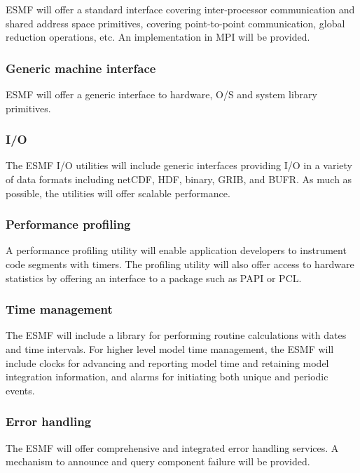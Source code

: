 ESMF will offer a standard interface covering inter-processor
communication and shared address space primitives, covering
point-to-point communication, global reduction operations, etc. An
implementation in MPI will be provided.

\subsubsection{Generic machine interface}

ESMF will offer a generic interface to hardware, O/S and system
library primitives.

\subsubsection{I/O}

The ESMF I/O utilities will include generic interfaces providing I/O
in a variety of data formats including netCDF, HDF, binary, GRIB, and
BUFR. As much as possible, the utilities will offer scalable
performance.

\subsubsection{Performance profiling}

A performance profiling utility will enable application developers to 
instrument code segments with timers. The profiling utility will also
offer access to hardware statistics by offering an interface to a
package such as PAPI or PCL.

\subsubsection{Time management}

The ESMF will include a library for performing routine 
calculations with dates and time intervals.  For higher level model
time management, the ESMF will include clocks for advancing and 
reporting model time and retaining model integration information, 
and alarms for initiating both unique and periodic events.

\subsubsection{Error handling}

The ESMF will offer comprehensive and integrated error handling
services.  A mechanism to announce and query component failure will be
provided.

